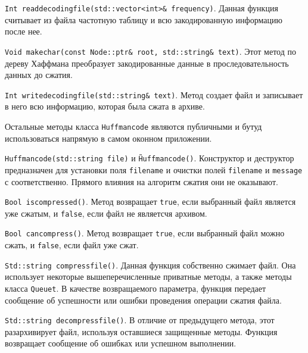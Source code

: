 \texttt{Int read{\textunderscore}decoding{\textunderscore}file(std::vector<int>\& frequency)}.
Данная функция считывает из файла частотную таблицу и всю закодированную информацию после нее.



\texttt{Void make{\textunderscore}char(const Node::ptr\& root, std::string\& text)}.
Этот метод по дереву Хаффмана преобразует закодированные данные в проследовательность данных до сжатия.



\texttt{Int write{\textunderscore}decoding{\textunderscore}file(std::string\& text)}.
Метод создает файл и записывает в него всю информацию, которая была сжата в архиве.



Остальные методы класса \texttt{Huffman{\textunderscore}code} являются публичными и бутуд использоваться напрямую в самом оконном приложении.



\texttt{Huffman{\textunderscore}code(std::string file)} и \texttt{\~Huffman{\textunderscore}code()}. 
Конструктор и деструктор\cite{lucik} предназначен для установки поля \texttt{filename} и очистки полей \texttt{filename} и \texttt{message} с соответственно.
Прямого влияния на алгоритм сжатия они не оказывают.



\texttt{Bool is{\textunderscore}compressed()}. 
Метод возвращает \texttt{true}, если выбранный файл является уже сжатым, и \texttt{false}, если файл не являетсчя архивом.



\texttt{Bool can{\textunderscore}compress()}.
Метод возвращает \texttt{true}, если выбранный файл можно сжать, и \texttt{false}, если файл уже сжат.



\texttt{Std::string compress{\textunderscore}file()}.
Данная функция собственно сжимает файл. 
Она использует некоторые вышеперечисленные приватные методы, а также методы класса \texttt{Queue{\textunderscore}t}.
В качестве возвращаемого параметра, функция передает сообщение об успешности или ошибки проведения операции сжатия файла.



\texttt{Std::string decompress{\textunderscore}file()}.
В отличие от предыдущего метода, этот разархивирует файл, используя оставшиеся защищенные методы.
Функция возвращает сообщение об ошибках или успешном выполнении.